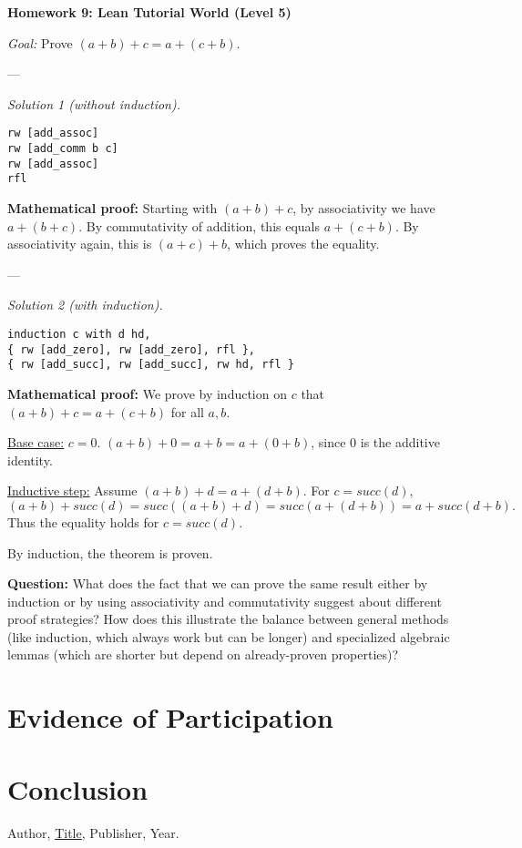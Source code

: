 \documentclass{article}
\theoremstyle{plain}
\theoremstyle{definition}
\theoremstyle{remark}
\begin{document}
\textbf{Homework 9: Lean Tutorial World (Level 5)}

\textit{Goal:} Prove $(a + b) + c = a + (c + b)$.

---

\textit{Solution 1 (without induction).}

\begin{verbatim}
rw [add_assoc]
rw [add_comm b c]
rw [add_assoc]
rfl
\end{verbatim}

\textbf{Mathematical proof:}  
Starting with $(a + b) + c$, by associativity we have $a + (b + c)$.  
By commutativity of addition, this equals $a + (c + b)$.  
By associativity again, this is $(a + c) + b$, which proves the equality.

---

\textit{Solution 2 (with induction).}

\begin{verbatim}
induction c with d hd,
{ rw [add_zero], rw [add_zero], rfl },
{ rw [add_succ], rw [add_succ], rw hd, rfl }
\end{verbatim}

\textbf{Mathematical proof:}  
We prove by induction on $c$ that $(a + b) + c = a + (c + b)$ for all $a, b$.  

\underline{Base case:} $c = 0$.  
$(a + b) + 0 = a + b = a + (0 + b)$, since $0$ is the additive identity.  

\underline{Inductive step:} Assume $(a + b) + d = a + (d + b)$.  
For $c = succ(d)$,  
\[
(a + b) + succ(d) = succ((a + b) + d) = succ(a + (d + b)) = a + succ(d + b).
\]  
Thus the equality holds for $c = succ(d)$.  

By induction, the theorem is proven.


\textbf{Question:} What does the fact that we can prove the same result either by induction or by using associativity and commutativity suggest about different proof strategies? How does this illustrate the balance between general methods (like induction, which always work but can be longer) and specialized algebraic lemmas (which are shorter but depend on already-proven properties)?



\section{Evidence of Participation}

\section{Conclusion}\label{conclusion}

\begin{thebibliography}{99}
 Author, \href{https://en.wikipedia.org/wiki/LaTeX}{Title}, Publisher, Year.
\end{thebibliography}
\end{document}
